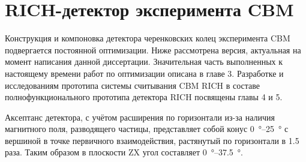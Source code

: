 \section{RICH-детектор эксперимента CBM}\label{sec:secCBMrich}




Конструкция и компоновка детектора черенковских колец эксперимента CBM подвергается постоянной оптимизации. Ниже рассмотрена версия, актуальная на момент написания данной диссертации. Значительная часть выполненных к настоящему времени работ по оптимизации описана в главе 3. Разработке и исследованиям прототипа системы считывания CBM RICH в составе полнофункционального прототипа детектора RICH посвящены главы 4 и 5. %

Аксептанс детектора, с учётом расширения по горизонтали из-за наличия магнитного поля, разводящего частицы, представляет собой конус \SI{0}{\degree}--\SI{25}{\degree} с вершиной в точке первичного взаимодействия, растянутый по горизонтали в 1.5 раза. Таким образом в плоскости ZX угол составляет \SI{0}{\degree}--\SI{37.5}{\degree}.

